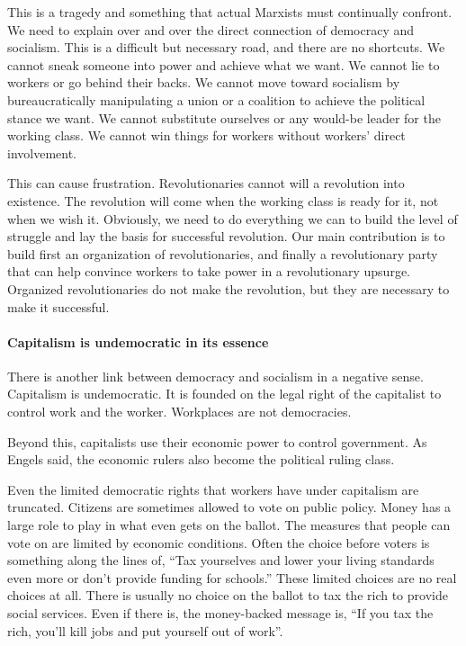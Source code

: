 This is a tragedy and something that actual Marxists must continually confront. We need to explain over and over the direct connection of democracy and socialism. This is a difficult but necessary road, and there are no shortcuts. We cannot sneak someone into power and achieve what we want. We cannot lie to workers or go behind their backs. We cannot move toward socialism by bureaucratically manipulating a union or a coalition to achieve the political stance we want. We cannot substitute ourselves or any would-be leader for the working class. We cannot win things for workers without workers’ direct involvement.

This can cause frustration. Revolutionaries cannot will a revolution into existence. The revolution will come when the working class is ready for it, not when we wish it. Obviously, we need to do everything we can to build the level of struggle and lay the basis for successful revolution. Our main contribution is to build first an organization of revolutionaries, and finally a revolutionary party that can help convince workers to take power in a revolutionary upsurge. Organized revolutionaries do not make the revolution, but they are necessary to make it successful.

\paragraph{Capitalism is undemocratic in its essence}

There is another link between democracy and socialism in a negative sense. Capitalism is undemocratic. It is founded on the legal right of the capitalist to control work and the worker. Workplaces are not democracies.

Beyond this, capitalists use their economic power to control government. As Engels said, the economic rulers also become the political ruling class.

Even the limited democratic rights that workers have under capitalism are truncated. Citizens are sometimes allowed to vote on public policy. Money has a large role to play in what even gets on the ballot. The measures that people can vote on are limited by economic conditions. Often the choice before voters is something along the lines of, “Tax yourselves and lower your living standards even more or don’t provide funding for schools.” These limited choices are no real choices at all. There is usually no choice on the ballot to tax the rich to provide social services. Even if there is, the money-backed message is, “If you tax the rich, you’ll kill jobs and put yourself out of work”.

